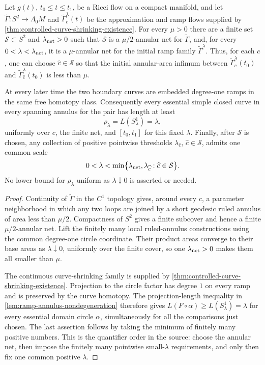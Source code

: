 \begin{lemma}
\label{lem:finite-net-ramp-nondegeneration}
\notready
Let $g(t)$, $t_0\le t\le t_1$, be a Ricci flow on a compact manifold, and let
$\widetilde\Gamma\colon S^2\to\Lambda_0M$ and
$\widetilde\Gamma_c^\lambda(t)$ be the approximation and ramp flows supplied
by \ref{thm:controlled-curve-shrinking-existence}.  For every $\mu>0$ there
are a finite set ${\mathcal S}\subset S^2$ and $\lambda_{\rm net}>0$ such
that ${\mathcal S}$ is a $\mu/2$-annular net for
$\widetilde\Gamma$, and, for every
$0<\lambda<\lambda_{\rm net}$, it is a $\mu$-annular net for the initial
ramp family $\widetilde\Gamma^\lambda$.  Thus, for each $c$, one can choose
$\widehat c\in{\mathcal S}$ so that the initial annular-area infimum between
$\widetilde\Gamma_c^\lambda(t_0)$ and
$\widetilde\Gamma_{\widehat c}^\lambda(t_0)$ is less than $\mu$.

At every later time the two boundary curves are embedded degree-one ramps in
the same free homotopy class.  Consequently every essential simple closed
curve in every spanning annulus for the pair has length at least
\[
 \rho_\lambda=L(S^1_\lambda)=\lambda,
\]
uniformly over $c$, the finite net, and $[t_0,t_1]$ for this fixed
$\lambda$.  Finally, after ${\mathcal S}$ is chosen, any collection of
positive pointwise thresholds $\lambda_{\widehat c}$,
$\widehat c\in{\mathcal S}$, admits one common scale
\[
 0<\lambda<\min\bigl\{\lambda_{\rm net},
     \lambda_{\widehat c}:\widehat c\in{\mathcal S}\bigr\}.
\]
No lower bound for $\rho_\lambda$ uniform as $\lambda\downarrow0$ is
asserted or needed.
\end{lemma}

\begin{proof}
Continuity of $\widetilde\Gamma$ in the $C^1$ topology gives, around every
$c$, a parameter neighborhood in which any two loops are joined by a short
geodesic ruled annulus of area less than $\mu/2$.  Compactness of $S^2$ gives
a finite subcover and hence a finite $\mu/2$-annular net.  Lift the finitely
many local ruled-annulus constructions using the common degree-one circle
coordinate.  Their product areas converge to their base areas as
$\lambda\downarrow0$, uniformly over the finite cover, so one
$\lambda_{\rm net}>0$ makes them all smaller than $\mu$.

The continuous curve-shrinking family is supplied by
\ref{thm:controlled-curve-shrinking-existence}.  Projection to the circle
factor has degree $1$ on every ramp and is preserved by the curve homotopy.
The projection-length inequality in
\ref{lem:ramp-annulus-nondegeneration} therefore gives
$L(F\circ\alpha)\ge L(S^1_\lambda)=\lambda$ for every essential domain
circle $\alpha$, simultaneously for all the comparisons just chosen.  The
last assertion follows by taking the minimum of finitely many positive
numbers.  This is the quantifier order in the source: choose the annular net,
then impose the finitely many pointwise small-$\lambda$ requirements, and
only then fix one common positive $\lambda$.
\end{proof}

